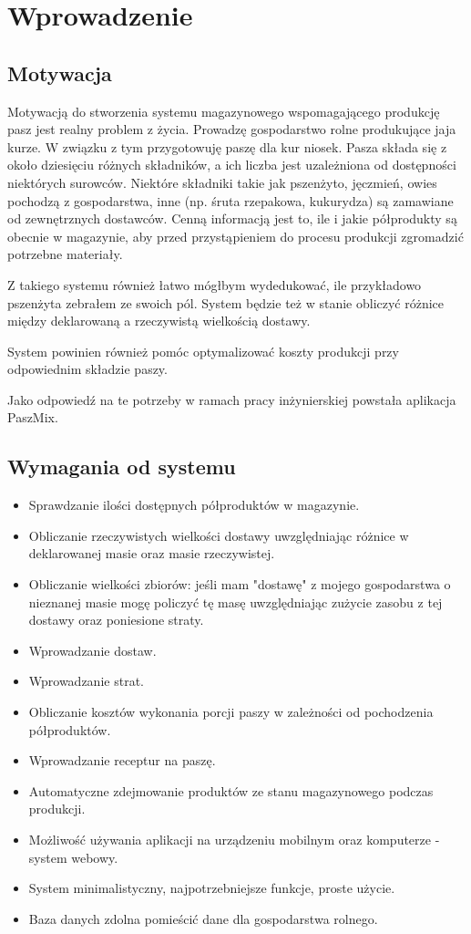 \documentclass[shortabstract]{iithesis}
\author         {Jakub Kopystiański}
\begin{document}

\chapter{Wprowadzenie}

\section{Motywacja}
	Motywacją do stworzenia systemu magazynowego wspomagającego produkcję pasz jest realny problem z życia. Prowadzę gospodarstwo rolne produkujące jaja kurze. W związku z tym przygotowuję paszę dla kur niosek. Pasza składa się z około dziesięciu różnych składników, a ich liczba jest uzależniona od dostępności niektórych surowców. Niektóre składniki takie jak pszenżyto, jęczmień, owies pochodzą z gospodarstwa, inne (np. śruta rzepakowa, kukurydza) są zamawiane od zewnętrznych dostawców. Cenną informacją jest to, ile i jakie półprodukty są obecnie w magazynie, aby przed przystąpieniem do procesu produkcji zgromadzić potrzebne materiały.

	Z takiego systemu również łatwo mógłbym wydedukować, ile przykładowo pszenżyta zebrałem ze swoich pól. System będzie też w stanie obliczyć różnice między deklarowaną a rzeczywistą wielkością dostawy.
	
	System powinien również pomóc optymalizować koszty produkcji przy odpowiednim składzie paszy. 
	
	Jako odpowiedź na te potrzeby w ramach pracy inżynierskiej powstała aplikacja PaszMix. 

\section {Wymagania od systemu}

\begin{itemize}
  \item Sprawdzanie ilości dostępnych półproduktów w magazynie.
  \item Obliczanie rzeczywistych wielkości dostawy uwzględniając różnice w deklarowanej masie oraz masie rzeczywistej.
  \item Obliczanie wielkości zbiorów: jeśli mam "dostawę"{} z mojego gospodarstwa o nieznanej masie mogę policzyć tę masę uwzględniając zużycie zasobu z tej dostawy oraz poniesione straty.
  \item  Wprowadzanie dostaw.
  \item  Wprowadzanie strat.
  \item  Obliczanie kosztów wykonania porcji paszy w zależności od pochodzenia półproduktów.
  \item  Wprowadzanie receptur na paszę.
  \item  Automatyczne zdejmowanie produktów ze stanu magazynowego podczas produkcji.
  \item Możliwość używania aplikacji na urządzeniu mobilnym oraz komputerze - system webowy.
  \item System minimalistyczny, najpotrzebniejsze funkcje, proste użycie.
  \item Baza danych zdolna pomieścić dane dla gospodarstwa rolnego.
\end{itemize} 
\end{document}
